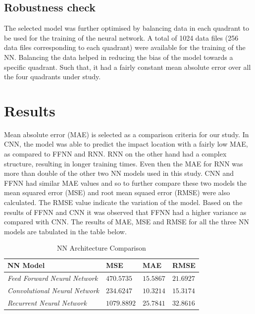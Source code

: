 \documentclass[12pt]{article}
\begin{document}
\par
\subsection{Robustness check}
\par
The selected model was further optimised by balancing data in each quadrant to be used for the training of the neural network. A total of 1024 data files (256 data files corresponding to each quadrant) were available for the training of the NN. Balancing the data helped in reducing the bias of the model towards a specific quadrant. Such that, it had a fairly constant mean absolute error over all the four quadrants under study. 


\section{Results}

Mean absolute error (MAE) is selected as a comparison criteria for our study. In CNN, the model was able to predict the impact location with a fairly low MAE, as compared to FFNN and RNN. RNN on the other hand had a complex structure, resulting in longer training times. Even then the MAE for RNN was more than double of the other two NN models used in this study. CNN and FFNN had similar MAE values and so to further compare these two models the mean squared error (MSE) and root mean squaed error (RMSE) were also calculated. The RMSE value indicate the variation of the model. Based on the results of FFNN and CNN it was observed that FFNN had a higher variance as compared with CNN. The results of MAE, MSE and RMSE for all the three NN models are tabulated in the table below.

\begin{table}[H]
\centering
\begin{tabular}{|m{1 in}|m{1 in}|m{1 in}|m{1 in}|}
\hline
\textbf{NN Model} & \textbf{MSE} & \textbf{MAE} & \textbf{RMSE} \\
\hline
\textit{Feed Forward Neural Network} & $470.5735$ & $15.5867$ & $21.6927$\\
\hline
\textit{Convolutional Neural Network} & $234.6247$ & $10.3214$ & $15.3174$\\
\hline
\textit{Recurrent Neural Network} & $1079.8892$ & $25.7841$ & $32.8616$ \\
\hline
\end{tabular}
\caption{NN Architecture Comparison}
\label{archCompTab}
\end{table}
\end{document}
